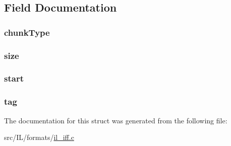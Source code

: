 \subsection{Field Documentation}
\hypertarget{struct__iff__chunk_ab66d2ac3de08ec1f806d142dded70c5e}{
\subsubsection[{chunk\-Type}]{ chunk\-Type}}\label{struct__iff__chunk_ab66d2ac3de08ec1f806d142dded70c5e}
\hypertarget{struct__iff__chunk_ae9842d9af0c4b351729c2a3a5be087a6}{
\subsubsection[{size}]{ size}}\label{struct__iff__chunk_ae9842d9af0c4b351729c2a3a5be087a6}
\hypertarget{struct__iff__chunk_a6828124a46d2f49a09e1f2cbda556a8a}{
\subsubsection[{start}]{ start}}\label{struct__iff__chunk_a6828124a46d2f49a09e1f2cbda556a8a}
\hypertarget{struct__iff__chunk_a17d9abf60583db274749d9f754585197}{
\subsubsection[{tag}]{ tag}}\label{struct__iff__chunk_a17d9abf60583db274749d9f754585197}


The documentation for this struct was generated from the following file\-:\begin{DoxyCompactItemize}
\item 
src/\-I\-L/formats/\hyperlink{il__iff_8c}{il\-\_\-iff.\-c}\end{DoxyCompactItemize}
